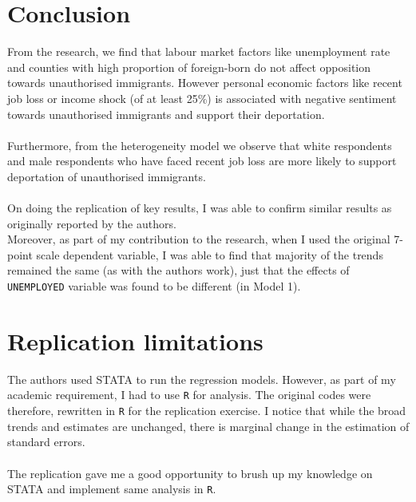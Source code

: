 \documentclass[12pt,letterpaper]{article}
\begin{document}
\pagebreak

\section*{Conclusion}
From the research, we find that labour market factors like unemployment rate and counties with high proportion of foreign-born do not affect opposition towards unauthorised immigrants. However personal economic factors like recent job loss or income shock (of at least 25\%) is associated with negative sentiment towards unauthorised immigrants and support their deportation.\\
\\Furthermore, from the heterogeneity model we observe that white respondents and male respondents who have faced recent job loss are more likely to support deportation of unauthorised immigrants.\\
\\On doing the replication of key results, I was able to confirm similar results as originally reported by the authors.\\
Moreover, as part of my contribution to the research, when I used the original 7-point scale dependent variable, I was able to find that majority of the trends remained the same (as with the authors work), just that the effects of \texttt{UNEMPLOYED} variable was found to be different (in Model 1).

\vspace*{.2cm}

\section*{Replication limitations}
The authors used STATA to run the regression models. However, as part of my academic requirement, I had to use \texttt{R} for analysis. The original codes were therefore, rewritten in \texttt{R} for the replication exercise. I notice that while the broad trends and estimates are unchanged, there is marginal change in the estimation of standard errors.\\
\\The replication gave me a good opportunity to brush up my knowledge on STATA and implement same analysis in \texttt{R}.
\end{document}

